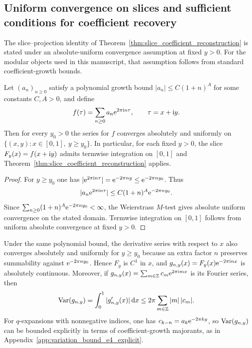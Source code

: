 \subsection{Uniform convergence on slices and sufficient conditions for coefficient recovery}
\label{app:qexp_uniform_convergence}

The slice--projection identity of Theorem~\ref{thm:slice_coefficient_reconstruction} is stated under an absolute-uniform convergence assumption at fixed $y>0$. For the modular objects used in this manuscript, that assumption follows from standard coefficient-growth bounds.

\begin{proposition}
\label{prop:poly_growth_uniform_slice}
Let $(a_n)_{n\ge 0}$ satisfy a polynomial growth bound $|a_n|\le C(1+n)^A$ for some constants $C,A>0$, and define
\begin{equation}
f(\tau)=\sum_{n\ge 0} a_n \mathrm{e}^{2\pi \mathrm{i} n \tau},\qquad \tau=x+\mathrm{i} y.
\end{equation}
Then for every $y_0>0$ the series for $f$ converges absolutely and uniformly on $\{(x,y): x\in[0,1],\ y\ge y_0\}$. In particular, for each fixed $y>0$, the slice $F_y(x)=f(x+\mathrm{i} y)$ admits termwise integration on $[0,1]$ and Theorem~\ref{thm:slice_coefficient_reconstruction} applies.
\end{proposition}
\begin{proof}
For $y\ge y_0$ one has $|\mathrm{e}^{2\pi \mathrm{i} n\tau}|=\mathrm{e}^{-2\pi n y}\le \mathrm{e}^{-2\pi n y_0}$. Thus
\begin{equation}
|a_n \mathrm{e}^{2\pi \mathrm{i} n\tau}|\le C(1+n)^A \mathrm{e}^{-2\pi n y_0}.
\end{equation}
Since $\sum_{n\ge 0}(1+n)^A \mathrm{e}^{-2\pi n y_0}<\infty$, the Weierstrass $M$-test gives absolute uniform convergence on the stated domain. Termwise integration on $[0,1]$ follows from uniform absolute convergence at fixed $y>0$.
\end{proof}

\begin{remark}
Under the same polynomial bound, the derivative series with respect to $x$ also converges absolutely and uniformly for $y\ge y_0$ because an extra factor $n$ preserves summability against $\mathrm{e}^{-2\pi n y_0}$. Hence $F_y$ is $C^1$ in $x$, and $g_{n,y}(x)=F_y(x)\mathrm{e}^{-2\pi\mathrm{i} n x}$ is absolutely continuous. Moreover, if $g_{n,y}(x)=\sum_{m\in\mathbb{Z}} c_m \mathrm{e}^{2\pi\mathrm{i} m x}$ is its Fourier series, then
\begin{equation}
\mathrm{Var}(g_{n,y})=\int_0^1 |g_{n,y}'(x)|\,\mathrm{d} x
\le 2\pi \sum_{m\in\mathbb{Z}} |m|\,|c_m|.
\end{equation}
For $q$-expansions with nonnegative indices, one has $c_{k-n}=a_k \mathrm{e}^{-2\pi k y}$, so $\mathrm{Var}(g_{n,y})$ can be bounded explicitly in terms of coefficient-growth majorants, as in Appendix~\ref{app:variation_bound_e4_explicit}.
\end{remark}

